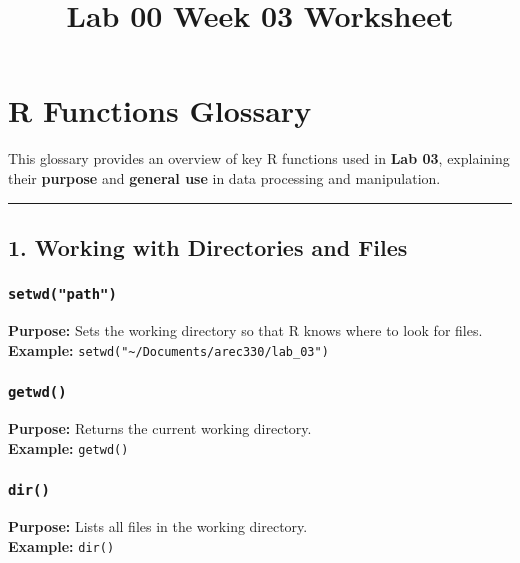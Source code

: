 \documentclass[
  11pt,
]{article}
\title{Lab 00 Week 03 Worksheet}
\author{}
\date{\vspace{-2.5em}}
\begin{document}
\maketitle

\section{\texorpdfstring{\textbf{R Functions
Glossary}}{R Functions Glossary}}\label{r-functions-glossary}

This glossary provides an overview of key R functions used in
\textbf{Lab 03}, explaining their \textbf{purpose} and \textbf{general
use} in data processing and manipulation.

\begin{center}\rule{0.5\linewidth}{0.5pt}\end{center}

\subsection{\texorpdfstring{\textbf{1. Working with Directories and
Files}}{1. Working with Directories and Files}}\label{working-with-directories-and-files}

\subsubsection{\texorpdfstring{\textbf{\texttt{setwd("path")}}}{setwd("path")}}\label{setwdpath}

\textbf{Purpose:} Sets the working directory so that R knows where to
look for files.\\
\textbf{Example:}
\texttt{setwd("\textasciitilde{}/Documents/arec330/lab\_03")}

\subsubsection{\texorpdfstring{\textbf{\texttt{getwd()}}}{getwd()}}\label{getwd}

\textbf{Purpose:} Returns the current working directory.\\
\textbf{Example:} \texttt{getwd()}

\subsubsection{\texorpdfstring{\textbf{\texttt{dir()}}}{dir()}}\label{dir}

\textbf{Purpose:} Lists all files in the working directory.\\
\textbf{Example:} \texttt{dir()}
\end{document}
